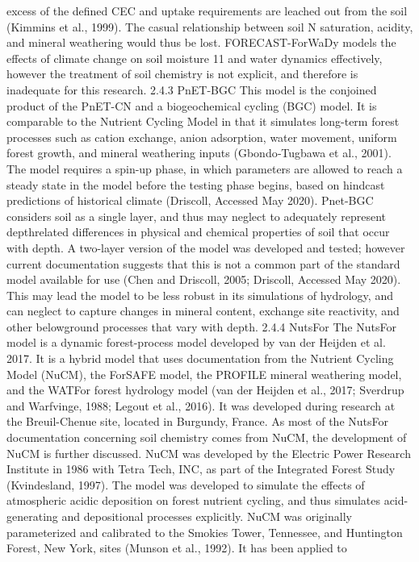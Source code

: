 \documentclass{article}
\begin{document}
excess of the defined CEC and uptake requirements are leached out from the soil (Kimmins et
al., 1999). The casual relationship between soil N saturation, acidity, and mineral weathering
would thus be lost. FORECAST-ForWaDy models the effects of climate change on soil moisture 
11
and water dynamics effectively, however the treatment of soil chemistry is not explicit, and
therefore is inadequate for this research.
2.4.3 PnET-BGC
This model is the conjoined product of the PnET-CN and a biogeochemical cycling (BGC)
model. It is comparable to the Nutrient Cycling Model in that it simulates long-term forest
processes such as cation exchange, anion adsorption, water movement, uniform forest growth,
and mineral weathering inputs (Gbondo‐Tugbawa et al., 2001). The model requires a spin-up
phase, in which parameters are allowed to reach a steady state in the model before the testing
phase begins, based on hindcast predictions of historical climate (Driscoll, Accessed May 2020).
Pnet-BGC considers soil as a single layer, and thus may neglect to adequately represent depthrelated differences in physical and chemical properties of soil that occur with depth. A two-layer
version of the model was developed and tested; however current documentation suggests that
this is not a common part of the standard model available for use (Chen and Driscoll, 2005;
Driscoll, Accessed May 2020). This may lead the model to be less robust in its simulations of
hydrology, and can neglect to capture changes in mineral content, exchange site reactivity, and
other belowground processes that vary with depth.
2.4.4 NutsFor
The NutsFor model is a dynamic forest-process model developed by van der Heijden et al. 2017.
It is a hybrid model that uses documentation from the Nutrient Cycling Model (NuCM), the
ForSAFE model, the PROFILE mineral weathering model, and the WATFor forest hydrology
model (van der Heijden et al., 2017; Sverdrup and Warfvinge, 1988; Legout et al., 2016). It was
developed during research at the Breuil-Chenue site, located in Burgundy, France.
As most of the NutsFor documentation concerning soil chemistry comes from NuCM, the
development of NuCM is further discussed. NuCM was developed by the Electric Power
Research Institute in 1986 with Tetra Tech, INC, as part of the Integrated Forest Study
(Kvindesland, 1997). The model was developed to simulate the effects of atmospheric acidic
deposition on forest nutrient cycling, and thus simulates acid-generating and depositional
processes explicitly. NuCM was originally parameterized and calibrated to the Smokies Tower,
Tennessee, and Huntington Forest, New York, sites (Munson et al., 1992). It has been applied to
\end{document}
